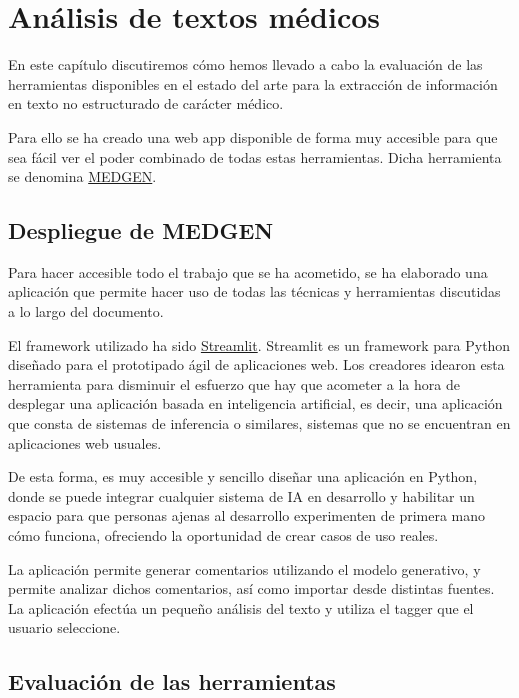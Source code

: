 \chapter{Análisis de textos médicos}

En este capítulo discutiremos cómo hemos llevado a cabo la evaluación de las herramientas disponibles en el estado del arte para la extracción de información en texto no estructurado de carácter médico.

Para ello se ha creado una web app disponible de forma muy accesible para que sea fácil ver el poder combinado de todas estas herramientas. Dicha herramienta se denomina \href{https://share.streamlit.io/jesi-rgb/medical-text-analysis/src/streamlit_gen_test.py}{MEDGEN}.



\section{Despliegue de MEDGEN}

Para hacer accesible todo el trabajo que se ha acometido, se ha elaborado una aplicación que permite hacer uso de todas las técnicas y herramientas discutidas a lo largo del documento. 

El framework utilizado ha sido \href{https://streamlit.io}{Streamlit}. Streamlit es un framework para Python diseñado para el prototipado ágil de aplicaciones web. Los creadores idearon esta herramienta para disminuir el esfuerzo que hay que acometer a la hora de desplegar una aplicación basada en inteligencia artificial, es decir, una aplicación que consta de sistemas de inferencia o similares, sistemas que no se encuentran en aplicaciones web usuales. 

De esta forma, es muy accesible y sencillo diseñar una aplicación en Python, donde se puede integrar cualquier sistema de IA en desarrollo y habilitar un espacio para que personas ajenas al desarrollo experimenten de primera mano cómo funciona, ofreciendo la oportunidad de crear casos de uso reales.

La aplicación permite generar comentarios utilizando el modelo generativo, y permite analizar dichos comentarios, así como importar desde distintas fuentes. La aplicación efectúa un pequeño análisis del texto y utiliza el tagger que el usuario seleccione.

\section{Evaluación de las herramientas}

